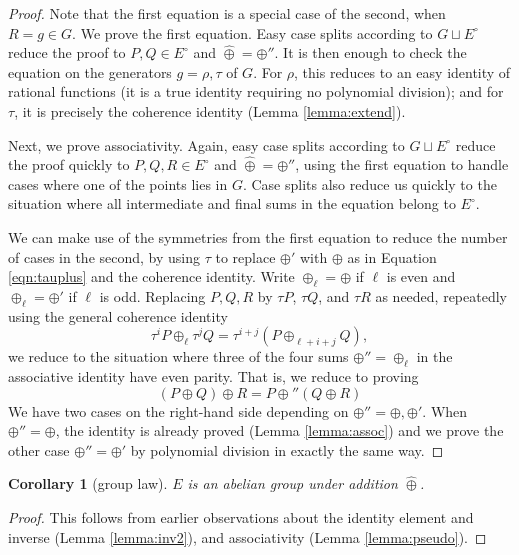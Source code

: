 \documentclass[12pt]{article}
\newtheorem{corollary}[theorem]{Corollary}
\newcommand{\Eoo}{E^{\circ}}
\newcommand{\hplus}{\hat\oplus}
\begin{document}
\begin{proof}  
  Note that the first equation is a special case of the second, when
  $R=g\in G$.  We prove the first equation.  Easy case splits
  according to $G\sqcup \Eoo$ reduce the proof to $P,Q\in \Eoo$ and
  $\hplus =\oplus''$.  It is then enough to check the equation on the
  generators $g=\rho,\tau$ of $G$.  For $\rho$, this reduces to an easy
  identity of rational functions 
  (it is a true identity requiring no polynomial division);
  and for $\tau$, it is precisely the coherence identity (Lemma \ref{lemma:extend}).

  Next, we prove associativity.  Again, easy case splits
  according to $G\sqcup \Eoo$ reduce the proof quickly to $P,Q,R\in
  \Eoo$ and $\hplus = \oplus''$, using the first equation to handle
  cases where one of the points lies in $G$.  Case splits also reduce
  us quickly to the situation where all intermediate and final sums in
  the equation belong to $\Eoo$.  
  
  We can make use of the symmetries
  from the first equation to reduce the number of cases in the second,
  by using $\tau$ to replace $\oplus'$ with $\oplus$ as in Equation
  \ref{eqn:tauplus} and the coherence identity.  Write $\oplus_\ell=\oplus$ if $\ell$ is even and
  $\oplus_\ell=\oplus'$ if $\ell$ is odd.
  Replacing $P,Q,R$ by $\tau P$, $\tau Q$, and $\tau
  R$ as needed,  repeatedly using the general coherence identity 
  \[
  \tau^i P\oplus_{\ell} \tau^j Q = \tau^{i+j} (P\oplus_{\ell+i+j} Q),
  \]
  we reduce to the situation where three of the four sums $\oplus''=\oplus_\ell$ 
  in the associative identity have even parity.  That is, we reduce to proving
  \[
  (P\oplus Q)\oplus R = P \oplus'' (Q\oplus R)
  \]
  We have two cases on the right-hand side depending on
  $\oplus'' =\oplus,\oplus'$.  When $\oplus''=\oplus$, the
  identity is already proved (Lemma \ref{lemma:assoc}) and
  we prove the other case $\oplus''=\oplus'$ by  polynomial
  division in exactly the same way.
\end{proof}

\begin{corollary}[group law] $E$ is an abelian group under addition $\hplus$.
\end{corollary}

\begin{proof} This follows from earlier observations about the 
  identity element and inverse (Lemma \ref{lemma:inv2}),
  and associativity (Lemma \ref{lemma:pseudo}).
\end{proof}
\end{document}
